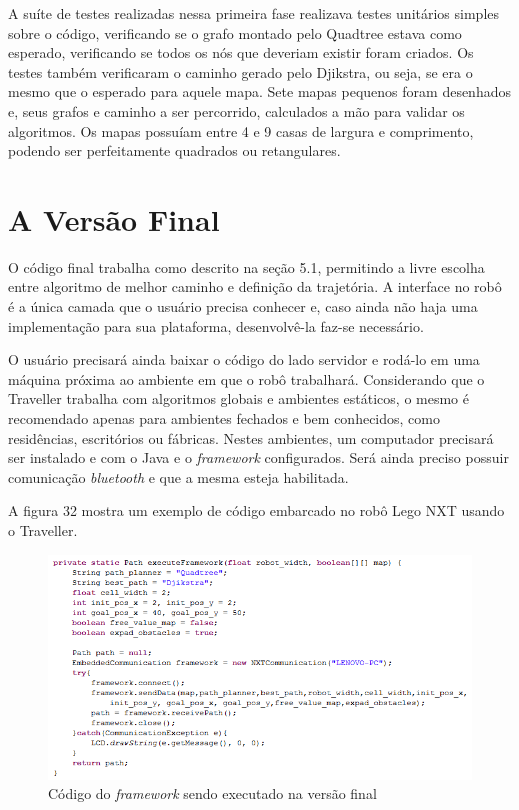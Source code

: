 A suíte de testes realizadas nessa primeira fase realizava testes unitários simples sobre o código, verificando se o grafo montado pelo Quadtree estava como esperado, verificando se todos os nós que deveriam existir foram criados. Os testes também verificaram o caminho gerado pelo Djikstra, ou seja, se era o mesmo que o esperado para aquele mapa. Sete mapas pequenos foram desenhados e, seus grafos e caminho a ser percorrido, calculados a mão para validar os algoritmos. Os mapas possuíam entre 4 e 9 casas de largura e comprimento, podendo ser perfeitamente quadrados ou retangulares.

\section{A Versão Final}

O código final trabalha como descrito na seção 5.1, permitindo a livre escolha entre algoritmo de melhor caminho e definição da trajetória. A interface no robô é a única camada que o usuário precisa conhecer e, caso ainda não haja uma implementação para sua plataforma, desenvolvê-la faz-se necessário.

O usuário precisará ainda baixar o código do lado servidor e rodá-lo em uma máquina próxima ao ambiente em que o robô trabalhará. Considerando que o Traveller trabalha com algoritmos globais e ambientes estáticos, o mesmo é recomendado apenas para ambientes fechados e bem conhecidos, como residências, escritórios ou fábricas. Nestes ambientes, um computador precisará ser instalado e com o Java e o \textit{framework} configurados. Será ainda preciso possuir comunicação \textit{bluetooth} e que a mesma esteja habilitada.

A figura 32 mostra um exemplo de código embarcado no robô Lego NXT usando o Traveller.

\begin{figure}[h]
	\centering
	\label{fig32}
		\includegraphics[keepaspectratio=true,scale=0.8]{figuras/codigofinal.PNG}
	\caption{Código do \textit{framework} sendo executado na versão final}
\end{figure}

